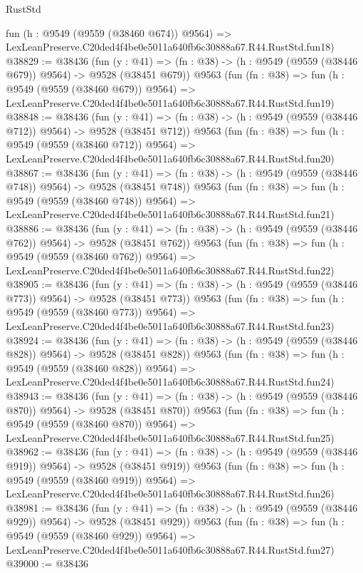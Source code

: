\begin{lexlean}{RustStd}
\begin{coremodule}
    fun (h : @9549 (@9559 (@38460 @674)) @9564) =>
    LexLeanPreserve.C20ded4f4be0e5011a640fb6c30888a67.R44.RustStd.fun18)
@38829 := @38436
    (fun (y : @41) => (fn : @38) -> (h : @9549 (@9559 (@38446 @679)) @9564) -> @9528 (@38451 @679))
    @9563
    (fun (fn : @38) =>
    fun (h : @9549 (@9559 (@38460 @679)) @9564) =>
    LexLeanPreserve.C20ded4f4be0e5011a640fb6c30888a67.R44.RustStd.fun19)
@38848 := @38436
    (fun (y : @41) => (fn : @38) -> (h : @9549 (@9559 (@38446 @712)) @9564) -> @9528 (@38451 @712))
    @9563
    (fun (fn : @38) =>
    fun (h : @9549 (@9559 (@38460 @712)) @9564) =>
    LexLeanPreserve.C20ded4f4be0e5011a640fb6c30888a67.R44.RustStd.fun20)
@38867 := @38436
    (fun (y : @41) => (fn : @38) -> (h : @9549 (@9559 (@38446 @748)) @9564) -> @9528 (@38451 @748))
    @9563
    (fun (fn : @38) =>
    fun (h : @9549 (@9559 (@38460 @748)) @9564) =>
    LexLeanPreserve.C20ded4f4be0e5011a640fb6c30888a67.R44.RustStd.fun21)
@38886 := @38436
    (fun (y : @41) => (fn : @38) -> (h : @9549 (@9559 (@38446 @762)) @9564) -> @9528 (@38451 @762))
    @9563
    (fun (fn : @38) =>
    fun (h : @9549 (@9559 (@38460 @762)) @9564) =>
    LexLeanPreserve.C20ded4f4be0e5011a640fb6c30888a67.R44.RustStd.fun22)
@38905 := @38436
    (fun (y : @41) => (fn : @38) -> (h : @9549 (@9559 (@38446 @773)) @9564) -> @9528 (@38451 @773))
    @9563
    (fun (fn : @38) =>
    fun (h : @9549 (@9559 (@38460 @773)) @9564) =>
    LexLeanPreserve.C20ded4f4be0e5011a640fb6c30888a67.R44.RustStd.fun23)
@38924 := @38436
    (fun (y : @41) => (fn : @38) -> (h : @9549 (@9559 (@38446 @828)) @9564) -> @9528 (@38451 @828))
    @9563
    (fun (fn : @38) =>
    fun (h : @9549 (@9559 (@38460 @828)) @9564) =>
    LexLeanPreserve.C20ded4f4be0e5011a640fb6c30888a67.R44.RustStd.fun24)
@38943 := @38436
    (fun (y : @41) => (fn : @38) -> (h : @9549 (@9559 (@38446 @870)) @9564) -> @9528 (@38451 @870))
    @9563
    (fun (fn : @38) =>
    fun (h : @9549 (@9559 (@38460 @870)) @9564) =>
    LexLeanPreserve.C20ded4f4be0e5011a640fb6c30888a67.R44.RustStd.fun25)
@38962 := @38436
    (fun (y : @41) => (fn : @38) -> (h : @9549 (@9559 (@38446 @919)) @9564) -> @9528 (@38451 @919))
    @9563
    (fun (fn : @38) =>
    fun (h : @9549 (@9559 (@38460 @919)) @9564) =>
    LexLeanPreserve.C20ded4f4be0e5011a640fb6c30888a67.R44.RustStd.fun26)
@38981 := @38436
    (fun (y : @41) => (fn : @38) -> (h : @9549 (@9559 (@38446 @929)) @9564) -> @9528 (@38451 @929))
    @9563
    (fun (fn : @38) =>
    fun (h : @9549 (@9559 (@38460 @929)) @9564) =>
    LexLeanPreserve.C20ded4f4be0e5011a640fb6c30888a67.R44.RustStd.fun27)
@39000 := @38436

\end{coremodule}
\end{lexlean}
